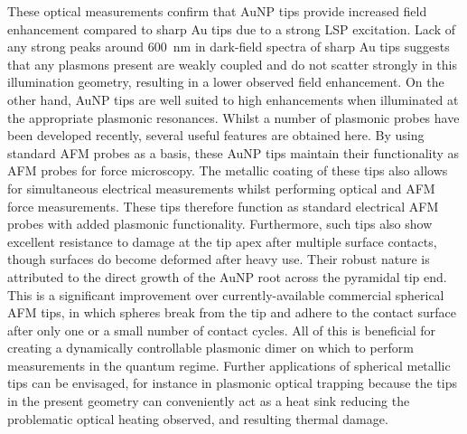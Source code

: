 \documentclass{article}
\begin{document}
These optical measurements confirm that AuNP tips provide increased field enhancement compared to sharp Au tips due to a strong LSP excitation. Lack of any strong peaks around \SI{600}{nm} in dark-field spectra of sharp Au tips suggests that any plasmons present are weakly coupled and do not scatter strongly in this illumination geometry, resulting in a lower observed field enhancement. On the other hand, AuNP tips are well suited to high enhancements when illuminated at the appropriate plasmonic resonances.
Whilst a number of plasmonic probes have been developed recently, several useful features are obtained here. By using standard AFM probes as a basis, these AuNP tips maintain their functionality as AFM probes for force microscopy. The metallic coating of these tips also allows for simultaneous electrical measurements whilst performing optical and AFM force measurements. These tips therefore function as standard electrical AFM probes with added plasmonic functionality.
Furthermore, such tips also show excellent resistance to damage at the tip apex after multiple surface contacts, though surfaces do become deformed after heavy use. Their robust nature is attributed to the direct growth of the AuNP root across the pyramidal tip end. This is a significant improvement over currently-available commercial spherical AFM tips, in which spheres break from the tip and adhere to the contact surface after only one or a small number of contact cycles. All of this is beneficial for creating a dynamically controllable plasmonic dimer on which to perform measurements in the quantum regime.
Further applications of spherical metallic tips can be envisaged, for instance in plasmonic optical trapping \cite{lindquist2013} because the tips in the present geometry can conveniently act as a heat sink reducing the problematic optical heating observed, and resulting thermal damage.
\end{document}
